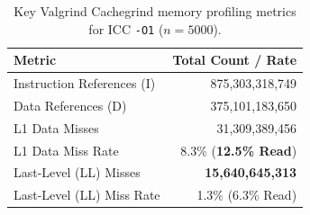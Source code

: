 \begin{table}[H]
\centering
\caption{Key Valgrind Cachegrind memory profiling metrics for ICC \texttt{-O1} ($n=5000$).}
\label{tab:cachegrind_results_o1}
\begin{tabular}{lr}
\toprule
\textbf{Metric} & \textbf{Total Count / Rate} \\
\midrule
Instruction References (I) & 875,303,318,749 \\
Data References (D)        & 375,101,183,650 \\
\midrule
L1 Data Misses             & 31,309,389,456 \\
L1 Data Miss Rate          & 8.3\% (\textbf{12.5\% Read}) \\
\midrule
Last-Level (LL) Misses     & \textbf{15,640,645,313} \\
Last-Level (LL) Miss Rate  & 1.3\% (6.3\% Read) \\
\bottomrule
\end{tabular}
\end{table}